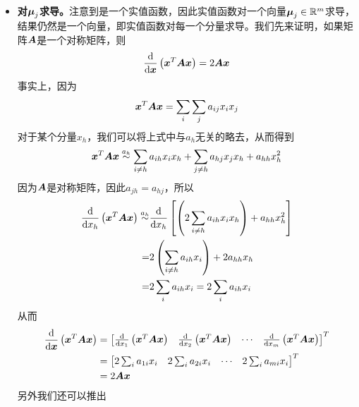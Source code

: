 \documentclass[a4paper,UTF8]{article}
\begin{document}
\begin{itemize}
\item \textbf{ 对\(\boldsymbol{\mu}_j\)求导。}注意到是一个实值函数，因此实值函数对一个向量\(\boldsymbol{\mu}_j\in\mathbb{R}^m\)求导，结果仍然是一个向量，即实值函数对每一个分量求导。我们先来证明，如果矩阵\(\boldsymbol{A}\)是一个对称矩阵，则\begin{equation}
    \frac{\mathrm{d}}{\mathrm{d} \boldsymbol{x}}\left(\boldsymbol{x}^T\boldsymbol{A}\boldsymbol{x}\right)=2\boldsymbol{A}\boldsymbol{x}
\end{equation}事实上，因为\begin{equation*}
    \boldsymbol{x}^T\boldsymbol{A}\boldsymbol{x}=\sum_i\sum_j a_{ij}x_ix_j
\end{equation*}对于某个分量\(x_h\)，我们可以将上式中与\(a_h\)无关的略去，从而得到\begin{equation*}
    \boldsymbol{x}^T\boldsymbol{A}\boldsymbol{x}\overset{a_h}{\sim}\sum_{i\neq h}a_{ih}x_ix_h+\sum_{j\neq h}a_{hj}x_jx_h+a_{hh}x_h^2
\end{equation*}因为\(\boldsymbol{A}\)是对称矩阵，因此\(a_{jh}=a_{hj}\)，所以\begin{equation*}
    \begin{split}
        \frac{\mathrm{d}}{\mathrm{d} x_h}\left(\boldsymbol{x}^T\boldsymbol{A}\boldsymbol{x}\right)
        \overset{a_h}{\sim}&\frac{\mathrm{d}}{\mathrm{d} x_h}\left[\left(2\sum_{i\neq h} a_{ih}x_ix_h\right)+a_{hh}x_h^2\right]\\
        =&2\left(\sum_{i\neq h} a_{ih}x_i\right)+2a_{hh}x_h\\
        =&2\sum_i a_{ih}x_i=2\sum_i a_{ih}x_i
    \end{split}
\end{equation*}从而\begin{equation*}
    \begin{split}
        \frac{\mathrm{d}}{\mathrm{d}\boldsymbol{x}}\left(\boldsymbol{x}^T\boldsymbol{A}\boldsymbol{x}\right)
        &=\begin{bmatrix}
            \frac{\mathrm{d}}{\mathrm{d} x_1}\left(\boldsymbol{x}^T\boldsymbol{A}\boldsymbol{x}\right)&\frac{\mathrm{d}}{\mathrm{d} x_2}\left(\boldsymbol{x}^T\boldsymbol{A}\boldsymbol{x}\right)&\cdots&\frac{\mathrm{d}}{\mathrm{d} x_m}\left(\boldsymbol{x}^T\boldsymbol{A}\boldsymbol{x}\right)
        \end{bmatrix}^T\\
        &=\begin{bmatrix}
            2\sum_i a_{1i}x_i&2\sum_i a_{2i}x_i&\cdots&2\sum_i a_{mi}x_i
        \end{bmatrix}^T\\
        &=2\boldsymbol{A}\boldsymbol{x}
    \end{split}
\end{equation*}另外我们还可以推出\begin{gather*}

\end{gather*}
\end{itemize}
\end{document}
